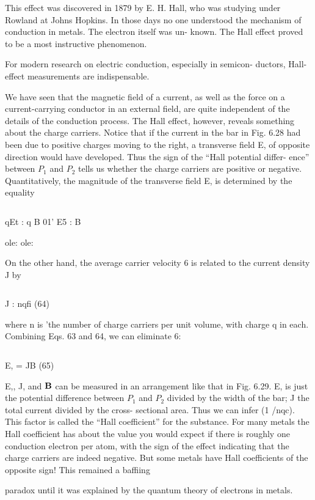 This effect was discovered in 1879 by E. H. Hall, who was studying
under Rowland at Johns Hopkins. In those days no one understood
the mechanism of conduction in metals. The electron itself was un-
known. The Hall effect proved to be a most instructive phenomenon.

 

For modern research on electric conduction, especially in semicon-
ductors, Hall-effect measurements are indispensable.

We have seen that the magnetic field of a current, as well as the
force on a current-carrying conductor in an external field, are quite
independent of the details of the conduction process. The Hall
effect, however, reveals something about the charge carriers. Notice
that if the current in the bar in Fig. 6.28 had been due to positive
charges moving to the right, a transverse field E, of opposite direction
would have developed. Thus the sign of the ``Hall potential differ-
ence'' between $P_1$ and $P_2$ tells us whether the charge carriers are positive
or negative. Quantitatively, the magnitude of the transverse
field E, is determined by the equality

\begin{equation}
\end{equation}

qEt : q B 01' E5 : B 

ole:
ole:

On the other hand, the average carrier velocity 6 is related to the
current density J by

\begin{equation}
\end{equation}

J : nqfi (64)

where n is 'the number of charge carriers per unit volume, with charge
q in each. Combining Eqs. 63 and 64, we can eliminate 6:

\begin{equation}
\end{equation}

E, = JB (65)

E,, J, and $\mathbf{B}$ can be measured in an arrangement like that in
Fig. 6.29. E, is just the potential difference between $P_1$ and $P_2$ divided
by the width of the bar; J the total current divided by the cross-
sectional area. Thus we can infer (1 /nqc). This factor is called the
``Hall coefficient'' for the substance. For many metals the Hall
coefficient has about the value you would expect if there is roughly
one conduction electron per atom, with the sign of the effect indicating
that the charge carriers are indeed negative. But some metals
have Hall coefficients of the opposite sign! This remained a baffiing

paradox until it was explained by the quantum theory of electrons
in metals.

\fi
